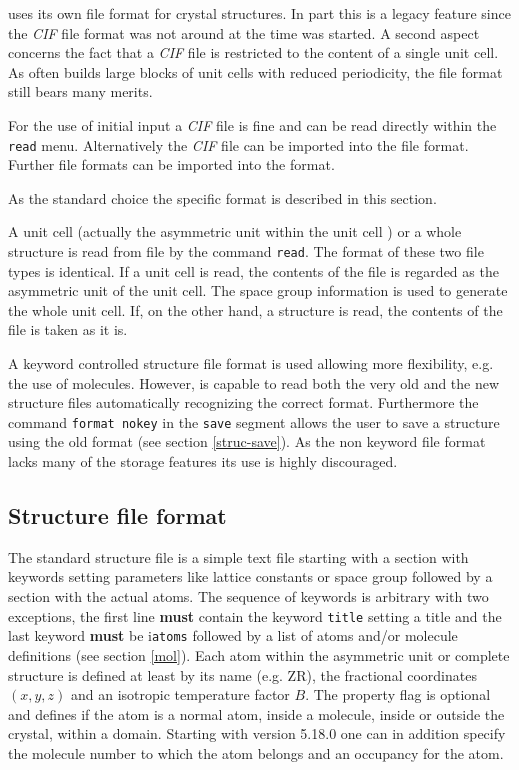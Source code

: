 \Discus uses its own file format for crystal structures. In part this 
is a legacy feature since the {\it CIF} file format was not around at the time 
\Discus was started. A second aspect concerns the fact that a {\it CIF} file 
is restricted to the content of a single unit cell. As \Discus 
often builds large blocks of unit cells with reduced periodicity, 
the \Discus file format still bears many merits.

For the use of initial input a {\it CIF} file is fine and can be 
read directly 
within the {\tt read} menu. Alternatively the {\it CIF} file can
be imported into the \Discus file format. Further file formats can 
be imported into the \Discus format.

As the standard choice the \Discus 
specific format is described in this section.

A unit cell (actually the asymmetric unit within the unit cell )
or a whole structure is read from file by the command
{\tt read}. The format of these two file types is identical.  If a
unit cell is read, the contents of the file is regarded as the
asymmetric unit of the unit cell.  The space group information is
used to generate the whole unit cell. If, on the other hand, a
structure is read, the contents of the file is taken as it is.  \par

A keyword controlled structure file format is used allowing more
flexibility, e.g. the use of molecules. However, \Discus is
capable to read both the very old and the new structure files
automatically recognizing the correct format. Furthermore the
command {\tt format nokey} in the {\tt save} segment allows the user
to save a structure using the old format (see section
\ref{struc-save}). As the non keyword file format lacks many of
the storage features its use is highly discouraged.


\subsection{Structure file format \label{struc-new}}

The standard \Discus structure file is a simple text file starting
with a section with keywords setting parameters like lattice
constants or space group followed by a section with the actual
atoms. The sequence of keywords is arbitrary with two exceptions,
the first line {\bf must} contain the keyword {\tt title} setting a
title and the last keyword {\bf must} be i{\tt atoms} followed by a list of
atoms and/or molecule definitions (see section \ref{mol}). Each atom
within the asymmetric unit or complete structure is defined 
at least by its
name (e.g. ZR), the fractional coordinates $(x,y,z)$ and an
isotropic temperature factor $B$. The property flag is optional
and defines if the atom is a normal atom, inside a molecule, inside
or outside the crystal, within a domain. 
Starting with version 5.18.0 one can in addition specify the 
molecule number to which the atom belongs and an occupancy for the atom.


